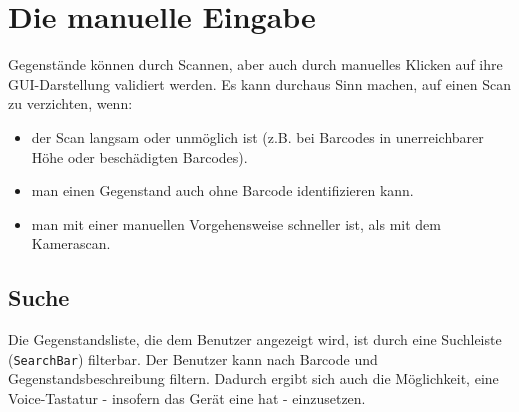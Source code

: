 \begin{Shaded}
\begin{Highlighting}[]
  \NormalTok{(}
    \NormalTok{) \{}
        \NormalTok{) \{}
            \NormalTok{(}\NormalTok{);}
\NormalTok{        \}}
\NormalTok{\}}
\end{Highlighting}
\end{Shaded}

\hypertarget{die-manuelle-eingabe}{%
\section{Die manuelle Eingabe}\label{die-manuelle-eingabe}}

Gegenstände können durch Scannen, aber auch durch manuelles Klicken auf
ihre GUI-Darstellung validiert werden. Es kann durchaus Sinn machen, auf
einen Scan zu verzichten, wenn:

\begin{itemize}
\tightlist
\item
  der Scan langsam oder unmöglich ist (z.B. bei Barcodes in
  unerreichbarer Höhe oder beschädigten Barcodes).
\item
  man einen Gegenstand auch ohne Barcode identifizieren kann.
\item
  man mit einer manuellen Vorgehensweise schneller ist, als mit dem
  Kamerascan.
\end{itemize}

\hypertarget{suche}{%
\subsection{Suche}\label{suche}}

Die Gegenstandsliste, die dem Benutzer angezeigt wird, ist durch eine
Suchleiste (\texttt{SearchBar}) filterbar. Der Benutzer kann nach
Barcode und Gegenstandsbeschreibung filtern. Dadurch ergibt sich auch
die Möglichkeit, eine Voice-Tastatur - insofern das Gerät eine hat -
einzusetzen.

